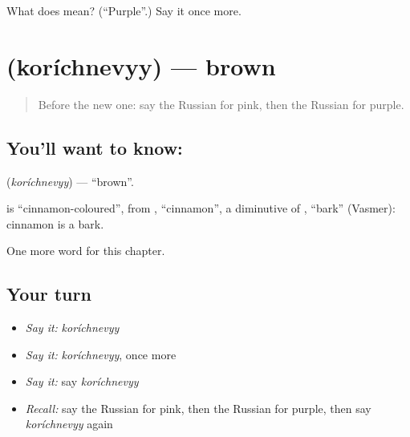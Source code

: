 \begin{tcolorbox}[breakable,colback=teal!4,colframe=teal!35!black,title={Before you move on}]
What does  mean? (\textquotedblleft{}Purple\textquotedblright{}.) Say it once more.
\end{tcolorbox}
\section[\texorpdfstring{\ru{коричневый} (koríchnevyy)}{коричневый (koríchnevyy)}]{ (koríchnevyy) — brown}

\label{lesson:RU-C124-brown}



\begin{quote}
Before the new one: say the Russian for pink, then the Russian for purple.
\end{quote}

\subsection*{You'll want to know: }
\textbf{} (\emph{koríchnevyy}) — \textquotedblleft{}brown\textquotedblright{}.

\begin{cousinweb}
\textbf{} is \textquotedblleft{}cinnamon-coloured\textquotedblright{}, from \emph{}, \textquotedblleft{}cinnamon\textquotedblright{}, a diminutive of \emph{}, \textquotedblleft{}bark\textquotedblright{} (Vasmer): cinnamon is a bark.
\end{cousinweb}

\begin{grammarlens}[title={What you've built}]
One more word for this chapter.
\end{grammarlens}

\subsection*{Your turn}
\begin{itemize}
\raggedright
  \item \emph{Say it:} \emph{koríchnevyy}
  \item \emph{Say it:} \emph{koríchnevyy}, once more
  \item \emph{Say it:} say \emph{koríchnevyy}
  \item \emph{Recall:} say the Russian for pink, then the Russian for purple, then say \emph{koríchnevyy} again
\end{itemize}

